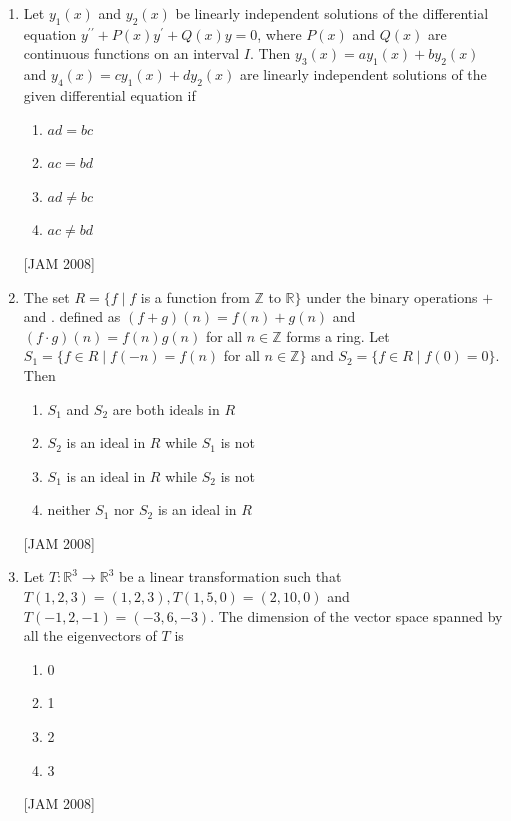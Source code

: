 \begin{enumerate}
 \item  Let $y_{1}(x)$ and $y_{2}(x)$ be linearly independent solutions of the differential equation $y^{\prime \prime}+P(x) y^{\prime}+Q(x) y=0$, where $P(x)$ and $Q(x)$ are continuous functions on an interval $I$. Then $y_{3}(x)=a y_{1}(x)+b y_{2}(x)$ and $y_{4}(x)=c y_{1}(x)+d y_{2}(x)$ are linearly independent solutions of the given differential equation if 
 \begin{enumerate}
\item $a d=b c$ 
\item $a c=b d$ 
\item $a d \neq b c$ 
\item $a c \neq b d$

\end{enumerate}
 \hfill [JAM 2008]

\item  The set $R=\{f \mid f$ is a function from $\mathbb{Z}$ to $\mathbb{R}\}$ under the binary operations $+$ and . defined as $(f+g)(n)=f(n)+g(n)$ and $(f \cdot g)(n)=f(n) g(n)$ for all $n \in \mathbb{Z}$ forms a ring. Let $S_{1}=\{f \in R \mid f(-n)=f(n)$ for all $n \in \mathbb{Z}\}$ and $S_{2}=\{f \in R \mid f(0)=0\}$. Then 
\begin{enumerate}
\item $S_{1}$ and $S_{2}$ are both ideals in $R$ 
\item $S_{2}$ is an ideal in $R$ while $S_{1}$ is not 
\item $S_{1}$ is an ideal in $R$ while $S_{2}$ is not 
\item neither $S_{1}$ nor $S_{2}$ is an ideal in $R$
\end{enumerate}
 \hfill [JAM 2008]




\item  Let $T: \mathbb{R}^{3} \rightarrow \mathbb{R}^{3}$ be a linear transformation such that $T(1,2,3)=(1,2,3), T(1,5,0)=(2,10,0)$ and $T(-1,2,-1)=(-3,6,-3)$. The dimension of the vector space spanned by all the eigenvectors of $T$ is 
\begin{enumerate}
\item 0 
\item 1 
\item 2 
\item 3
\end{enumerate}
 \hfill [JAM 2008]



\end{enumerate}
